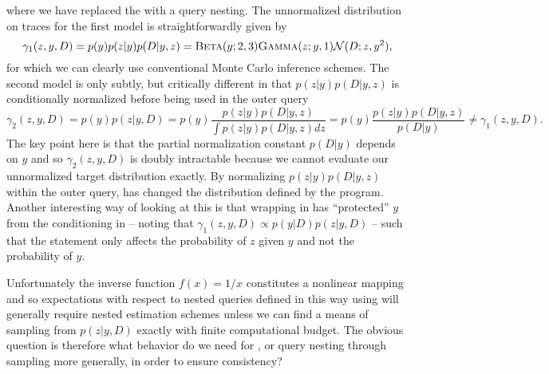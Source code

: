 \vspace{-15pt}
where we have replaced the  with a query nesting.  The unnormalized distribution on
traces for the first model is straightforwardly given by
\[
\gamma_1(z,y,D) = p(y)p(z|y)p(D|y,z) = \textsc{Beta}(y;2,3) \textsc{Gamma}(z;y,1) \mathcal{N}(D;z,y^2),
\]
for which we can clearly use conventional Monte Carlo inference schemes.  The second model
is only subtly, but critically different in that $p(z|y)p(D|y,z)$ is conditionally normalized 
before being used in the outer query
\[
\gamma_2(z,y,D) = p(y)p(z|y,D) = p(y)\frac{p(z|y)p(D|y,z)}{\int p(z|y)p(D|y,z)dz} = p(y)\frac{p(z|y)p(D|y,z)}{p(D|y)} \neq \gamma_1(z,y,D).
\]
The key point here is that the partial normalization constant $p(D|y)$ depends on $y$ and so 
$\gamma_2(z,y,D)$ is doubly intractable because we cannot evaluate our unnormalized target
distribution exactly.  By normalizing $p(z|y)p(D|y,z)$ within the outer query, 
 \conditional has changed the distribution defined by the program.  Another interesting way of looking at this
 is that wrapping  in \conditional has ``protected'' $y$ from the conditioning 
 in  -- noting
 that $\gamma_1 (z,y,D) \propto p(y|D)p(z|y,D)$ -- such that the \observe statement only affects the probability
 of $z$ given $y$ and not the probability of $y$.
 
 Unfortunately the inverse function $f(x) = 1/x$ constitutes
a nonlinear mapping and so expectations with respect to nested queries defined in this way using
\conditional will generally require nested estimation schemes unless we can find a means of
sampling from $p(z|y,D)$ exactly with finite computational budget.
The obvious question is therefore what behavior do we need for \conditional, or query nesting through sampling
more generally, in order to ensure consistency?  

